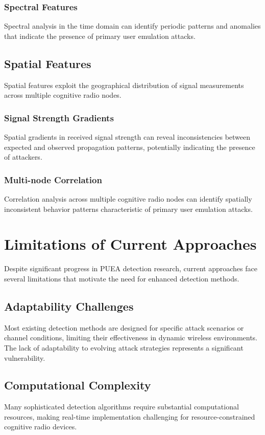 \subsubsection{Spectral Features}
Spectral analysis in the time domain can identify periodic patterns and anomalies that indicate the presence of primary user emulation attacks.

\subsection{Spatial Features}
Spatial features exploit the geographical distribution of signal measurements across multiple cognitive radio nodes.

\subsubsection{Signal Strength Gradients}
Spatial gradients in received signal strength can reveal inconsistencies between expected and observed propagation patterns, potentially indicating the presence of attackers.

\subsubsection{Multi-node Correlation}
Correlation analysis across multiple cognitive radio nodes can identify spatially inconsistent behavior patterns characteristic of primary user emulation attacks.

\section{Limitations of Current Approaches}
Despite significant progress in PUEA detection research, current approaches face several limitations that motivate the need for enhanced detection methods.

\subsection{Adaptability Challenges}
Most existing detection methods are designed for specific attack scenarios or channel conditions, limiting their effectiveness in dynamic wireless environments. The lack of adaptability to evolving attack strategies represents a significant vulnerability.

\subsection{Computational Complexity}
Many sophisticated detection algorithms require substantial computational resources, making real-time implementation challenging for resource-constrained cognitive radio devices.

